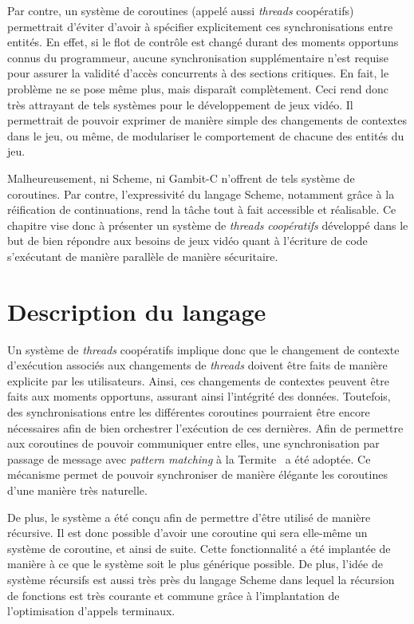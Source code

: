 \documentclass[12pt,oneside,letterpaper,francais]{book}
\begin{document}
Par contre, un système de coroutines (appelé aussi \textit{threads}
coopératifs) permettrait d'éviter d'avoir à spécifier explicitement
ces synchronisations entre entités. En effet, si le flot de contrôle
est changé durant des moments opportuns connus du programmeur, aucune
synchronisation supplémentaire n'est requise pour assurer la validité
d'accès concurrents à des sections critiques. En fait, le problème ne
se pose même plus, mais disparaît complètement. Ceci rend donc très
attrayant de tels systèmes pour le développement de jeux vidéo. Il
permettrait de pouvoir exprimer de manière simple des changements de
contextes dans le jeu, ou même, de modulariser le comportement de
chacune des entités du jeu.

Malheureusement, ni Scheme, ni Gambit-C n'offrent de tels système de
coroutines. Par contre, l'expressivité du langage Scheme, notamment
grâce à la réification de continuations, rend la tâche tout à fait
accessible et réalisable. Ce chapitre vise donc à présenter un système
de \textit{threads} \emph{coopératifs} développé dans le but de bien
répondre aux besoins de jeux vidéo quant à l'écriture de code
s'exécutant de manière parallèle de manière sécuritaire.


\section{Description du langage}

Un système de \textit{threads} coopératifs implique donc que le
changement de contexte d'exécution associés aux changements de
\textit{threads} doivent être faits de manière explicite par les
utilisateurs. Ainsi, ces changements de contextes peuvent être faits
aux moments opportuns, assurant ainsi l'intégrité des
données. Toutefois, des synchronisations entre les différentes
coroutines pourraient être encore nécessaires afin de bien orchestrer
l'exécution de ces dernières. Afin de permettre aux coroutines de
pouvoir communiquer entre elles, une synchronisation par passage de
message avec \textit{pattern matching} à la
Termite~\cite{Termite_paper} a été adoptée. Ce mécanisme permet de
pouvoir synchroniser de manière élégante les coroutines d'une manière
très naturelle.

De plus, le système a été conçu afin de permettre d'être utilisé de
manière récursive. Il est donc possible d'avoir une coroutine qui sera
elle-même un système de coroutine, et ainsi de suite. Cette
fonctionnalité a été implantée de manière à ce que le système soit le
plus générique possible. De plus, l'idée de système récursifs est
aussi très près du langage Scheme dans lequel la récursion de
fonctions est très courante et commune grâce à l'implantation de
l'optimisation d'appels terminaux.
\end{document}
